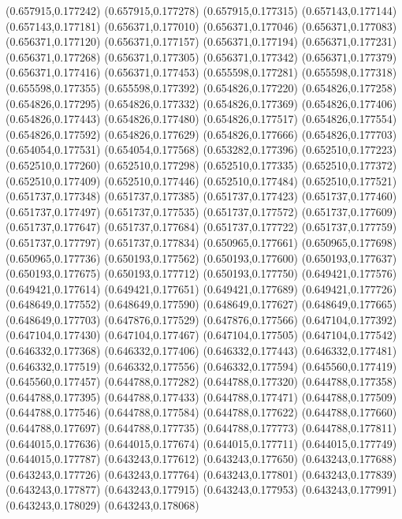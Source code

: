 (0.657915,0.177242)
(0.657915,0.177278)
(0.657915,0.177315)
(0.657143,0.177144)
(0.657143,0.177181)
(0.656371,0.177010)
(0.656371,0.177046)
(0.656371,0.177083)
(0.656371,0.177120)
(0.656371,0.177157)
(0.656371,0.177194)
(0.656371,0.177231)
(0.656371,0.177268)
(0.656371,0.177305)
(0.656371,0.177342)
(0.656371,0.177379)
(0.656371,0.177416)
(0.656371,0.177453)
(0.655598,0.177281)
(0.655598,0.177318)
(0.655598,0.177355)
(0.655598,0.177392)
(0.654826,0.177220)
(0.654826,0.177258)
(0.654826,0.177295)
(0.654826,0.177332)
(0.654826,0.177369)
(0.654826,0.177406)
(0.654826,0.177443)
(0.654826,0.177480)
(0.654826,0.177517)
(0.654826,0.177554)
(0.654826,0.177592)
(0.654826,0.177629)
(0.654826,0.177666)
(0.654826,0.177703)
(0.654054,0.177531)
(0.654054,0.177568)
(0.653282,0.177396)
(0.652510,0.177223)
(0.652510,0.177260)
(0.652510,0.177298)
(0.652510,0.177335)
(0.652510,0.177372)
(0.652510,0.177409)
(0.652510,0.177446)
(0.652510,0.177484)
(0.652510,0.177521)
(0.651737,0.177348)
(0.651737,0.177385)
(0.651737,0.177423)
(0.651737,0.177460)
(0.651737,0.177497)
(0.651737,0.177535)
(0.651737,0.177572)
(0.651737,0.177609)
(0.651737,0.177647)
(0.651737,0.177684)
(0.651737,0.177722)
(0.651737,0.177759)
(0.651737,0.177797)
(0.651737,0.177834)
(0.650965,0.177661)
(0.650965,0.177698)
(0.650965,0.177736)
(0.650193,0.177562)
(0.650193,0.177600)
(0.650193,0.177637)
(0.650193,0.177675)
(0.650193,0.177712)
(0.650193,0.177750)
(0.649421,0.177576)
(0.649421,0.177614)
(0.649421,0.177651)
(0.649421,0.177689)
(0.649421,0.177726)
(0.648649,0.177552)
(0.648649,0.177590)
(0.648649,0.177627)
(0.648649,0.177665)
(0.648649,0.177703)
(0.647876,0.177529)
(0.647876,0.177566)
(0.647104,0.177392)
(0.647104,0.177430)
(0.647104,0.177467)
(0.647104,0.177505)
(0.647104,0.177542)
(0.646332,0.177368)
(0.646332,0.177406)
(0.646332,0.177443)
(0.646332,0.177481)
(0.646332,0.177519)
(0.646332,0.177556)
(0.646332,0.177594)
(0.645560,0.177419)
(0.645560,0.177457)
(0.644788,0.177282)
(0.644788,0.177320)
(0.644788,0.177358)
(0.644788,0.177395)
(0.644788,0.177433)
(0.644788,0.177471)
(0.644788,0.177509)
(0.644788,0.177546)
(0.644788,0.177584)
(0.644788,0.177622)
(0.644788,0.177660)
(0.644788,0.177697)
(0.644788,0.177735)
(0.644788,0.177773)
(0.644788,0.177811)
(0.644015,0.177636)
(0.644015,0.177674)
(0.644015,0.177711)
(0.644015,0.177749)
(0.644015,0.177787)
(0.643243,0.177612)
(0.643243,0.177650)
(0.643243,0.177688)
(0.643243,0.177726)
(0.643243,0.177764)
(0.643243,0.177801)
(0.643243,0.177839)
(0.643243,0.177877)
(0.643243,0.177915)
(0.643243,0.177953)
(0.643243,0.177991)
(0.643243,0.178029)
(0.643243,0.178068)
